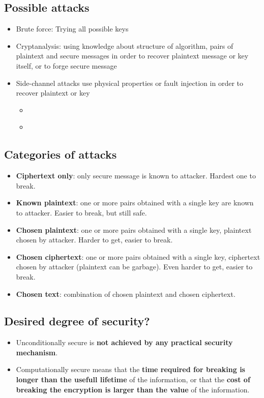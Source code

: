 \documentclass[11pt,british,faculty=ea,layout=titlefont,underline=false,titleUppercase=true,titleUnderline=true,hidelinks]{ugent2016-report}
\begin{document}
		\subsection{Possible attacks} \label{sub:security-threats-possible-attacks}
			\begin{itemize}
				\item Brute force: Trying all possible keys
				\item Cryptanalysis: using knowledge about structure of algorithm, pairs of plaintext and secure messages in order to recover plaintext message or key itself, or to forge secure message
				\item Side-channel attacks use physical properties or fault injection in order to recover plaintext or key
					\begin{itemize}
						\item {} \cite{Cade2014}
						\item {} \cite{Anthony2013}
					\end{itemize}
			\end{itemize}

		\subsection{Categories of attacks} \label{sub:categories-of-attacks}
		\begin{itemize}
			\item \textbf{Ciphertext only}: only secure message is known to attacker. Hardest one to break.
			\item \textbf{Known plaintext}: one or more pairs obtained with a single key are known to attacker. Easier to break, but still safe.
			\item \textbf{Chosen plaintext}: one or more pairs obtained with a single key, plaintext chosen by attacker. Harder to get, easier to break.
			\item \textbf{Chosen ciphertext}: one or more pairs obtained with a single key, ciphertext chosen by attacker (plaintext can be garbage). Even harder to get, easier to break.
			\item \textbf{Chosen text}: combination of chosen plaintext and chosen ciphertext.
		\end{itemize}

		\subsection{Desired degree of security?} \label{sub:desired-degree-of-security}
			\begin{itemize}
				\item Unconditionally secure is \textbf{not achieved by any practical security mechanism}.
				\item Computationally secure means that the \textbf{time required for breaking is longer than the usefull lifetime} of the information, or that the \textbf{cost of breaking the encryption is larger than the value} of the information.
			\end{itemize}

\printbibliography
\end{document}
